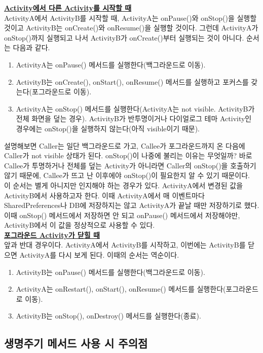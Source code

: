 \underline{\bfseries Activity에서 다른 Activity를 시작할 때}\\
ActivityA에서 ActivityB를 시작할 때, ActivityA는 onPause()와 onStop()을 실행할 것이고
ActivityB는 onCreate()와 onResume()을 실행할 것이다.
그런데 ActivityA가 onStop()까지 실행되고 나서 ActivityB가 onCreate()부터 실행되는 것이 아니다.
순서는 다음과 같다.
\begin{enumerate}
\item ActivityA는 onPause() 메서드를 실행한다(백그라운드로 이동).
\item ActivityB는 onCreate(), onStart(), onResume() 메서드를 실행하고 포커스를 갖는다(포그라운드로 이동).
\item ActivityA는 onStop() 메서드를 실행한다(ActivityA는 not visible. ActivityB가 전체 화면을 덮는 경우). ActivityB가 반투명이거나 다이얼로그 테마 Activity인 경우에는 onStop()을 실행하지 않는다(아직 visible이기 때문).
\end{enumerate}

설명해보면 Caller는 일단 백그라운드로 가고, Callee가 포그라운드까지 온 다음에 Caller가 not visible 상태가 된다.
onStop()이 나중에 불리는 이유는 무엇일까? 
바로 Callee가 투명하거나 전체를 덮는 Activity가 아니라면 Caller의 onStop()을 호출하기 않기 때문에, 
Callee가 뜨고 난 이후에야 onStop()이 필요한지 알 수 있기 때문이다.\\

이 순서는 별게 아니지만 인지해야 하는 경우가 있다. 
ActivityA에서 변경된 값을 ActivityB에서 사용하고자 한다.
이때 ActivityA에서 매 이벤트마다 
SharedPreferences나 DB에 저장하지는 않고 ActivityA가 끝날 때만 저장하기로 했다.
이때 onStop() 메서드에서 저장하면 안 되고 onPause() 메서드에서 저장해야만, ActivityB에서 이 값을 정상적으로 사용할 수 있다.\\

\underline{\bfseries 포그라운드 Activity가 닫힐 때}\\
앞과 반대 경우이다. 
ActivityA에서 ActivityB를 시작하고, 이번에는 ActivityB를 닫으면 ActivityA를 다시 보게 된다.
이때의 순서는 역순이다.
\begin{enumerate}
\item ActivityB는 onPause() 메서드를 실행한다(백그라운드로 이동).
\item ActivityA는 onRestart(), onStart(), onResume() 메서드를 실행한다(포그라운드로 이동).
\item ActivityB는 onStop(), onDestroy() 메서드를 실행한다(종료).
\end{enumerate}


\subsection{생명주기 메서드 사용 시 주의점}
